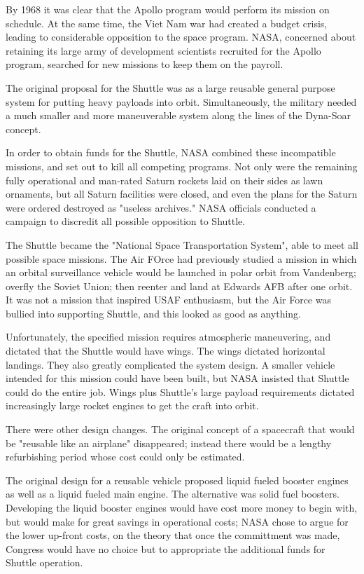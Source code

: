 By 1968 it was clear that the Apollo program would perform its mission on schedule. At the same time, the Viet Nam war had created a budget crisis, leading to considerable opposition to the space program. NASA, concerned about retaining its large army of development scientists recruited for the Apollo program, searched for new missions to keep them on the payroll.

The original proposal for the Shuttle was as a large reusable general purpose system for putting heavy payloads into orbit. Simultaneously, the military needed a much smaller and more maneuverable system along the lines of the Dyna-Soar concept.

In order to obtain funds for the Shuttle, NASA combined these incompatible missions, and set out to kill all competing programs. Not only were the remaining fully operational and man-rated Saturn rockets laid on their sides as lawn ornaments, but all Saturn facilities were closed, and even the plans for the Saturn were ordered destroyed as "useless archives." NASA officials conducted a campaign to discredit all possible opposition to Shuttle.

The Shuttle became the "National Space Transportation System", able to meet all possible space missions. The Air FOrce had previously studied a mission in which an orbital surveillance vehicle would be launched in polar orbit from Vandenberg; overfly the Soviet Union; then reenter and land at Edwards AFB after one orbit. It was not a mission that inspired USAF enthusiasm, but the Air Force was bullied into supporting Shuttle, and this looked as good as anything.

Unfortunately, the specified mission requires atmospheric maneuvering, and dictated that the Shuttle would have wings. The wings dictated horizontal landings. They also greatly complicated the system design. A smaller vehicle intended for this mission could have been built, but NASA insisted that Shuttle could do the entire job. Wings plus Shuttle's large payload requirements dictated increasingly large rocket engines to get the craft into orbit.

There were other design changes. The original concept of a spacecraft that would be "reusable like an airplane" disappeared; instead there would be a lengthy refurbishing period whose cost could only be estimated.

The original design for a reusable vehicle proposed liquid fueled booster engines as well as a liquid fueled main engine. The alternative was solid fuel boosters. Developing the liquid booster engines would have cost more money to begin with, but would make for great savings in operational costs; NASA chose to argue for the lower up-front costs, on the theory that once the committment was made, Congress would have no choice but to appropriate the additional funds for Shuttle operation.

